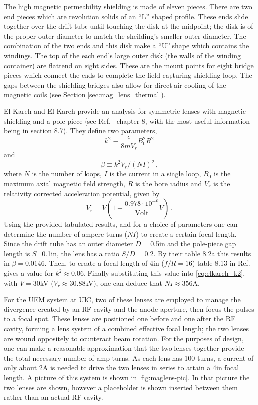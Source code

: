 The high magnetic permeability shielding is made of eleven pieces.
There are two end pieces which are revolution solids of an ``L'' shaped profile.
These ends slide together over the drift tube until touching the disk at the midpoint; the disk is of the proper outer diameter to match the sheilding's smaller outer diameter.
The combination of the two ends and this disk make a ``U'' shape which contains the windings.
The top of the each end's large outer disk (the walls of the winding container) are flattend on eight sides.
These are the mount points for eight bridge pieces which connect the ends to complete the field-capturing shielding loop.
The gaps between the shielding bridges also allow for direct air cooling of the magnetic coils (see Section \ref{sec:mag_lens_thermal}).

El-Kareh and El-Kareh provide an analysis for symmetric lenses with magnetic shielding and a pole-piece (see Ref.~\cite{el-kareh_electron_1970} chapter 8, with the most useful information being in section 8.7).
They define two parameters,
\begin{equation}
  k^2 \equiv \frac{e}{8 m V_r} B_0^2 R^2
\end{equation}
and
\begin{equation} \label{eq:elkareh_k2}
  \beta \equiv k^2 V_r / (NI)^2 \,\text{,}
\end{equation}
where $N$ is the number of loops, $I$ is the current in a single loop, $B_0$ is the maximum axial magnetic field strength, $R$ is the bore radius and $V_r$ is the relativity corrected acceleration potential, given by
\begin{equation}
  V_r = V ( 1 + \frac{0.978 \cdot 10^{-6}}{\text{Volt}} V ) \,\text{.}
\end{equation}
Using the provided tabulated results, and for a choice of parameters one can determine the number of ampere-turns ($NI$) to create a certain focal length.
Since the drift tube has an outer diameter $D=$0.5in and the pole-piece gap length is $S$=0.1in, the lens has a ratio $S/D=0.2$.
By their table 8.2a this results in $\beta=0.0146$.
Then, to create a focal length of 4in ($f/R=16$) table 8.13 in Ref.~\cite{el-kareh_electron_1970} gives a value for $k^2 \approx 0.06$.
Finally substituting this value into \ref{eq:elkareh_k2}, with $V=30$kV ($V_r\approx30.88$kV), one can deduce that $NI\approx356$A.

For the UEM system at UIC, two of these lenses are employed to manage the divergence created by an RF cavity and the anode aperture, then focus the pulses to a focal spot. 
These lenses are positioned one before and one after the RF cavity, forming a lens system of a combined effective focal length; the two lenses are wound oppositely to counteract beam rotation.
For the purposes of design, one can make a reasonable approximation that the two lenses together provide the total necessary number of amp-turns.
As each lens has 100 turns, a current of only about 2A is needed to drive the two lenses in series to attain a 4in focal length.
A picture of this system is shown in \ref{fig:maglens-pic}.
In that picture the two lenses are shown, however a placeholder is shown inserted between them rather than an actual RF cavity.


